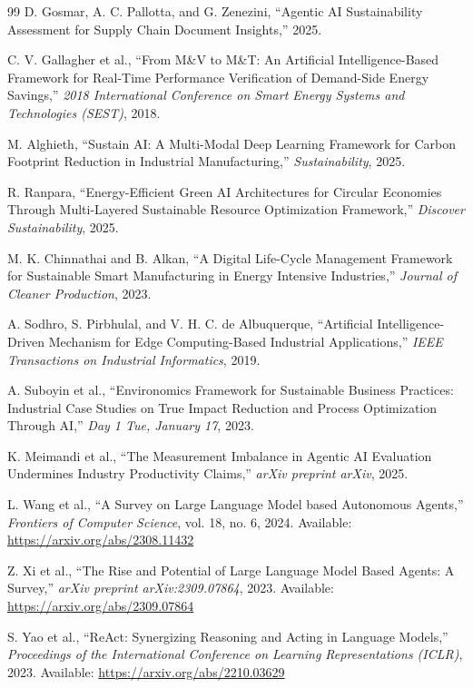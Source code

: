 \documentclass[11pt,a4paper]{article}
\begin{document}
\begin{thebibliography}{99}
D. Gosmar, A. C. Pallotta, and G. Zenezini,
``Agentic AI Sustainability Assessment for Supply Chain Document Insights,'' 2025.

C. V. Gallagher et al.,
``From M\&V to M\&T: An Artificial Intelligence-Based Framework for Real-Time Performance Verification of Demand-Side Energy Savings,''
\textit{2018 International Conference on Smart Energy Systems and Technologies (SEST)}, 2018.

M. Alghieth,
``Sustain AI: A Multi-Modal Deep Learning Framework for Carbon Footprint Reduction in Industrial Manufacturing,''
\textit{Sustainability}, 2025.

R. Ranpara,
``Energy-Efficient Green AI Architectures for Circular Economies Through Multi-Layered Sustainable Resource Optimization Framework,''
\textit{Discover Sustainability}, 2025.

M. K. Chinnathai and B. Alkan,
``A Digital Life-Cycle Management Framework for Sustainable Smart Manufacturing in Energy Intensive Industries,''
\textit{Journal of Cleaner Production}, 2023.

A. Sodhro, S. Pirbhulal, and V. H. C. de Albuquerque,
``Artificial Intelligence-Driven Mechanism for Edge Computing-Based Industrial Applications,''
\textit{IEEE Transactions on Industrial Informatics}, 2019.

A. Suboyin et al.,
``Environomics Framework for Sustainable Business Practices: Industrial Case Studies on True Impact Reduction and Process Optimization Through AI,''
\textit{Day 1 Tue, January 17}, 2023.

K. Meimandi et al.,
``The Measurement Imbalance in Agentic AI Evaluation Undermines Industry Productivity Claims,''
\textit{arXiv preprint arXiv}, 2025.

L. Wang et al.,
``A Survey on Large Language Model based Autonomous Agents,''
\textit{Frontiers of Computer Science}, vol. 18, no. 6, 2024.
Available: \url{https://arxiv.org/abs/2308.11432}

Z. Xi et al.,
``The Rise and Potential of Large Language Model Based Agents: A Survey,''
\textit{arXiv preprint arXiv:2309.07864}, 2023.
Available: \url{https://arxiv.org/abs/2309.07864}

S. Yao et al.,
``ReAct: Synergizing Reasoning and Acting in Language Models,''
\textit{Proceedings of the International Conference on Learning Representations (ICLR)}, 2023.
Available: \url{https://arxiv.org/abs/2210.03629}


\end{thebibliography}
\end{document}

